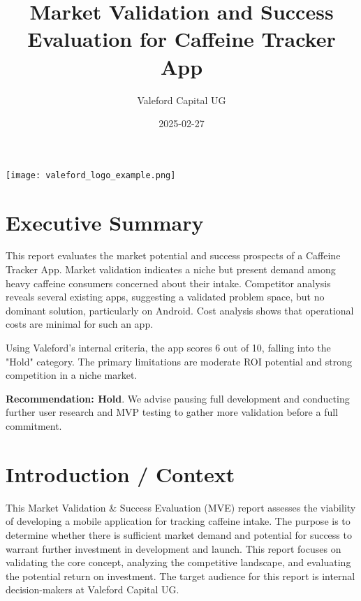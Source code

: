 \documentclass{article}
\title{\textbf{Market Validation and Success Evaluation for Caffeine Tracker App}}
\author{Valeford Capital UG}
\date{2025-02-27} %
\begin{document}
\maketitle
\thispagestyle{empty} %

\vspace*{\fill}
\begin{center}
\texttt{[image: valeford\_logo\_example.png]} %
\end{center}
\vspace*{\fill}

\newpage
\setcounter{page}{1} %
\tableofcontents
\newpage

\section{Executive Summary}
This report evaluates the market potential and success prospects of a Caffeine Tracker App. Market validation indicates a niche but present demand among heavy caffeine consumers concerned about their intake. Competitor analysis reveals several existing apps, suggesting a validated problem space, but no dominant solution, particularly on Android. Cost analysis shows that operational costs are minimal for such an app.

Using Valeford's internal criteria, the app scores 6 out of 10, falling into the "Hold" category. The primary limitations are moderate ROI potential and strong competition in a niche market.

\textbf{Recommendation: Hold}. We advise pausing full development and conducting further user research and MVP testing to gather more validation before a full commitment.

\section{Introduction / Context}
This Market Validation & Success Evaluation (MVE) report assesses the viability of developing a mobile application for tracking caffeine intake. The purpose is to determine whether there is sufficient market demand and potential for success to warrant further investment in development and launch. This report focuses on validating the core concept, analyzing the competitive landscape, and evaluating the potential return on investment. The target audience for this report is internal decision-makers at Valeford Capital UG.
\end{document}

